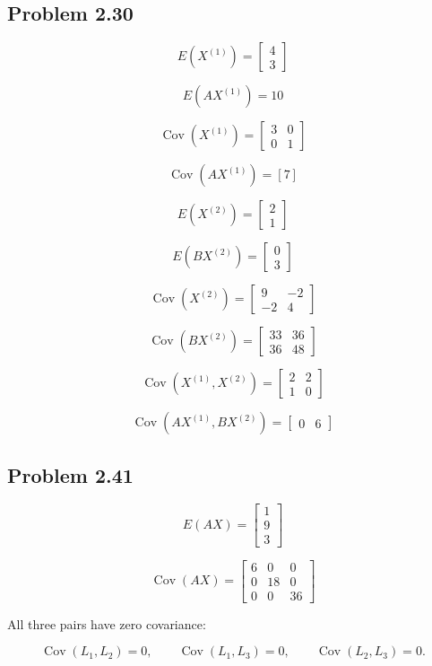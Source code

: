 \documentclass[12pt]{article}
\begin{document}
\subsection*{Problem 2.30}

\[
\boxed{
E(X^{(1)})
=
\begin{bmatrix}
4\\3
\end{bmatrix}}
\]

\[
\boxed{
E(AX^{(1)})=10
}
\]

\[
\boxed{
\operatorname{Cov}(X^{(1)})
=
\begin{bmatrix}
3&0\\
0&1
\end{bmatrix}}
\]

\[
\boxed{
\operatorname{Cov}(AX^{(1)})=[7]
}
\]

\[
\boxed{
E(X^{(2)})
=
\begin{bmatrix}
2\\1
\end{bmatrix}}
\]

\[
\boxed{
E(BX^{(2)})
=
\begin{bmatrix}
0\\3
\end{bmatrix}}
\]

\[
\boxed{
\operatorname{Cov}(X^{(2)})
=
\begin{bmatrix}
9&-2\\
-2&4
\end{bmatrix}}
\]

\[
\boxed{
\operatorname{Cov}(BX^{(2)})
=
\begin{bmatrix}
33&36\\
36&48
\end{bmatrix}}
\]

\[
\boxed{
\operatorname{Cov}(X^{(1)},X^{(2)})
=
\begin{bmatrix}
2&2\\
1&0
\end{bmatrix}}
\]

\[
\boxed{
\operatorname{Cov}(AX^{(1)},BX^{(2)})
=
\begin{bmatrix}
0&6
\end{bmatrix}}
\]

\subsection*{Problem 2.41}

\[
\boxed{
E(AX)
=
\begin{bmatrix}
1\\9\\3
\end{bmatrix}}
\]

\[
\boxed{
\operatorname{Cov}(AX)
=
\begin{bmatrix}
6&0&0\\
0&18&0\\
0&0&36
\end{bmatrix}}
\]

All three pairs have zero covariance:

\[
\boxed{
\operatorname{Cov}(L_1,L_2)=0,
\qquad
\operatorname{Cov}(L_1,L_3)=0,
\qquad
\operatorname{Cov}(L_2,L_3)=0.
}
\]
\end{document}
